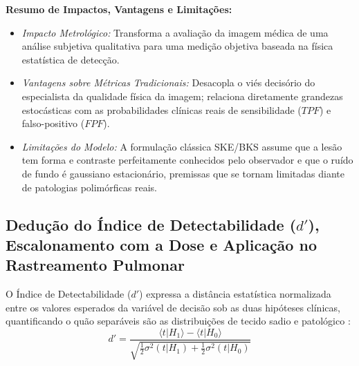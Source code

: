 \documentclass[
  12pt,
  a4paper,
  oneside
]{report}
\begin{document}
\noindent\textbf{Resumo de Impactos, Vantagens e Limitações:}
\begin{itemize}[leftmargin=*,noitemsep]
  \item \emph{Impacto Metrológico:} Transforma a avaliação da imagem médica de uma análise subjetiva qualitativa para uma medição objetiva baseada na física estatística de detecção.
  \item \emph{Vantagens sobre Métricas Tradicionais:} Desacopla o viés decisório do especialista da qualidade física da imagem; relaciona diretamente grandezas estocásticas com as probabilidades clínicas reais de sensibilidade ($TPF$) e falso-positivo ($FPF$).
  \item \emph{Limitações do Modelo:} A formulação clássica SKE/BKS assume que a lesão tem forma e contraste perfeitamente conhecidos pelo observador e que o ruído de fundo é gaussiano estacionário, premissas que se tornam limitadas diante de patologias polimórficas reais.
\end{itemize}

\subsection{Dedução do Índice de Detectabilidade (\texorpdfstring{$d'$}{d'}), Escalonamento com a Dose e Aplicação no Rastreamento Pulmonar}
\label{subsec:deducao_formal_dprime_e_escalonamento_dose}
O Índice de Detectabilidade ($d'$) expressa a distância estatística normalizada entre os valores esperados da variável de decisão sob as duas hipóteses clínicas, quantificando o quão separáveis são as distribuições de tecido sadio e patológico \cite{barrett_myers_2004}:
\begin{equation}
  d' = \frac{\langle t | H_1 \rangle - \langle t | H_0 \rangle}{\sqrt{\frac{1}{2}\sigma^2(t|H_1) + \frac{1}{2}\sigma^2(t|H_0)}}
  \label{eq:dprime_definicao_geral}
\end{equation}
\end{document}
